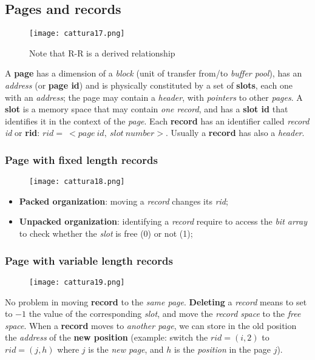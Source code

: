 \documentclass{article}
\begin{document}
\subsection{Pages and records}
\begin{figure}[H]
  \centering
  \texttt{[image: cattura17.png]}
   \caption{Note that R-R is a derived relationship}
\end{figure}
A \textbf{page} has a dimension of a \emph{block} (unit of transfer from/to \emph{buffer pool}), has an \emph{address} (or \textbf{page id}) and is physically constituted by a set of \textbf{slots}, each one with an \emph{address}; the page may contain a \emph{header}, with \emph{pointers} to other \emph{pages}. A \textbf{slot} is a memory space that may contain \emph{one record}, and has a \textbf{slot id} that identifies it in the context of the \emph{page}. Each \textbf{record} has an identifier called \emph{record id} or \textbf{rid}: $rid =\ <page\ id,\ slot\ number>$. Usually a \textbf{record} has also a \emph{header}. 
\subsubsection{Page with fixed length records}
\begin{figure}[H]
  \centering
  \texttt{[image: cattura18.png]}
\end{figure}
\begin{itemize}
\item \textbf{Packed organization}: moving a \emph{record} changes its \emph{rid};
\item \textbf{Unpacked organization}: identifying a \emph{record} require to access the \emph{bit array} to check whether the \emph{slot} is free (0) or not (1); 
\end{itemize}
\subsubsection{Page with variable length records}
\begin{figure}[H]
  \centering
  \texttt{[image: cattura19.png]}
\end{figure}
No problem in moving \textbf{record} to the \emph{same page}. \textbf{Deleting} a \emph{record} means to set to $-1$ the value of the corresponding \emph{slot}, and move the \emph{record space} to the \emph{free space}. When a \textbf{record} moves to \emph{another page}, we can store in the old position the \emph{address} of the \textbf{new position} (example: switch the $rid=(i,2)$ to $rid=(j,h)$ where $j$ is the \emph{new page}, and $h$ is the \emph{position} in the page $j$).
\end{document}
